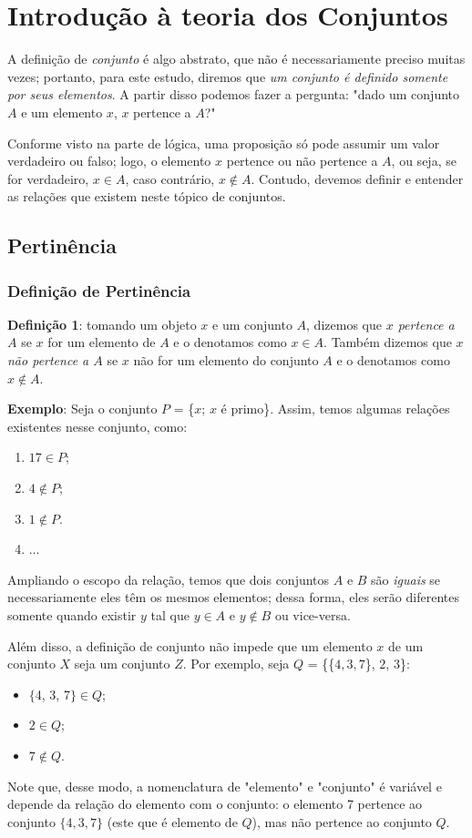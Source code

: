 \documentclass[13pt,letterpaper]{article}
\begin{document}
\section{Introdução à teoria dos Conjuntos}
A definição de \emph{conjunto} é algo abstrato, que não é necessariamente preciso muitas vezes; portanto, para este estudo, diremos que \emph{um conjunto é definido somente por seus elementos}. A partir disso podemos fazer a pergunta: "dado um conjunto $A$ e um elemento $x$, $x$ pertence a $A$?"
\par
Conforme visto na parte de lógica, uma proposição só pode assumir um valor verdadeiro ou falso; logo, o elemento $x$ pertence ou não pertence a $A$, ou seja, se for verdadeiro, $x \in A$, caso contrário, $x \notin A$. Contudo, devemos definir e entender as relações que existem neste tópico de conjuntos.

\subsection{Pertinência}
\subsubsection{Definição de Pertinência}
\textbf{Definição 1}: tomando um objeto $x$ e um conjunto $A$, dizemos que \emph{$x$ pertence a $A$} se $x$ for um elemento de $A$ e o denotamos como $x \in A$.
Também dizemos que \emph{$x$ não pertence a $A$} se $x$ não for um elemento do conjunto $A$ e o denotamos como $x \notin A$.
\par
\textbf{Exemplo}: Seja o conjunto $P$ = \{$x$; $x$ é primo\}. Assim, temos algumas relações existentes nesse conjunto, como: 
\begin{enumerate}
    \item $17 \in P$;
    \item $4 \notin P$;
    \item $1 \notin P$.
    \item ...
\end{enumerate}
Ampliando o escopo da relação, temos que dois conjuntos $A$ e $B$ são \emph{iguais} se necessariamente eles têm os mesmos elementos; dessa forma, eles serão diferentes somente quando existir $y$ tal que $y \in A$ e $y \notin B$ ou vice-versa.
\par
Além disso, a definição de conjunto não impede que um elemento $x$ de um conjunto $X$ seja um conjunto $Z$. Por exemplo, seja $Q$ = \{\{$4, 3, 7$\}, $2$, $3$\}:
\begin{itemize}
    \item $\{$4, 3, 7$\} \in Q$;
    \item $2 \in Q$;
    \item $7 \notin Q$.
\end{itemize}
Note que, desse modo, a nomenclatura de "elemento" e "conjunto" é variável e depende da relação do elemento com o conjunto: o elemento 7 pertence ao conjunto $\{4, 3, 7\}$ (este que é elemento de $Q$), mas não pertence ao conjunto $Q$.
\end{document}
